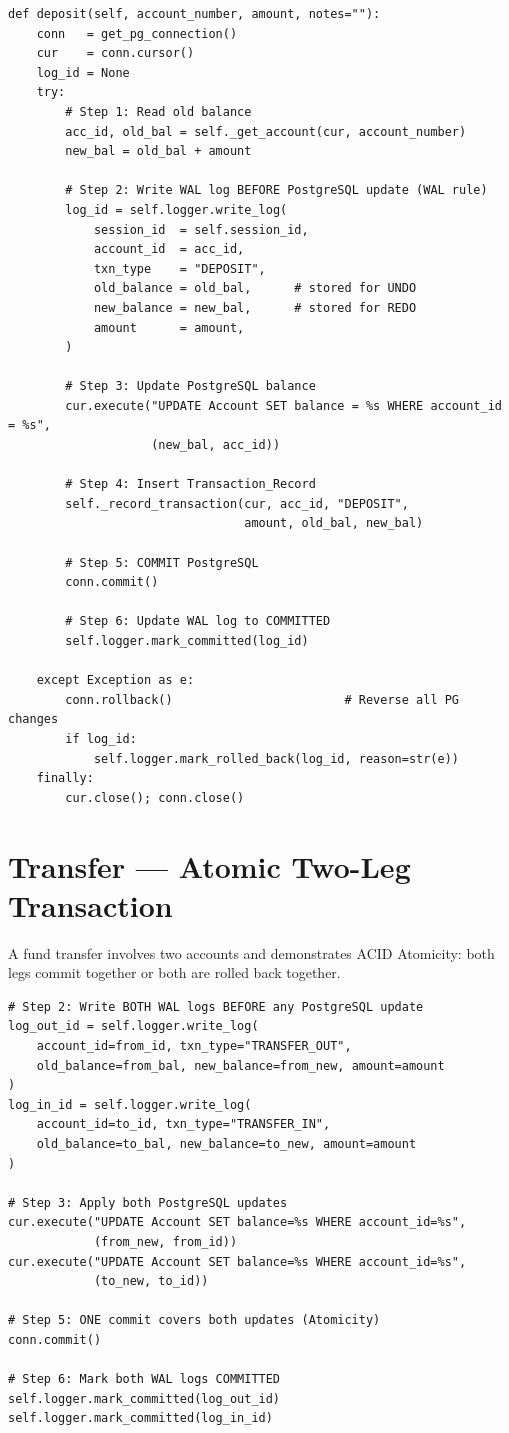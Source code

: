 \begin{lstlisting}[style=pythonstyle, caption={Deposit method --- WAL sequence in Python}]
def deposit(self, account_number, amount, notes=""):
    conn   = get_pg_connection()
    cur    = conn.cursor()
    log_id = None
    try:
        # Step 1: Read old balance
        acc_id, old_bal = self._get_account(cur, account_number)
        new_bal = old_bal + amount

        # Step 2: Write WAL log BEFORE PostgreSQL update (WAL rule)
        log_id = self.logger.write_log(
            session_id  = self.session_id,
            account_id  = acc_id,
            txn_type    = "DEPOSIT",
            old_balance = old_bal,      # stored for UNDO
            new_balance = new_bal,      # stored for REDO
            amount      = amount,
        )

        # Step 3: Update PostgreSQL balance
        cur.execute("UPDATE Account SET balance = %s WHERE account_id = %s",
                    (new_bal, acc_id))

        # Step 4: Insert Transaction_Record
        self._record_transaction(cur, acc_id, "DEPOSIT",
                                 amount, old_bal, new_bal)

        # Step 5: COMMIT PostgreSQL
        conn.commit()

        # Step 6: Update WAL log to COMMITTED
        self.logger.mark_committed(log_id)

    except Exception as e:
        conn.rollback()                        # Reverse all PG changes
        if log_id:
            self.logger.mark_rolled_back(log_id, reason=str(e))
    finally:
        cur.close(); conn.close()
\end{lstlisting}

\section{Transfer --- Atomic Two-Leg Transaction}

A fund transfer involves two accounts and demonstrates ACID Atomicity:
both legs commit together or both are rolled back together.

\begin{lstlisting}[style=pythonstyle, caption={Transfer --- two WAL logs, one PG commit}]
# Step 2: Write BOTH WAL logs BEFORE any PostgreSQL update
log_out_id = self.logger.write_log(
    account_id=from_id, txn_type="TRANSFER_OUT",
    old_balance=from_bal, new_balance=from_new, amount=amount
)
log_in_id = self.logger.write_log(
    account_id=to_id, txn_type="TRANSFER_IN",
    old_balance=to_bal, new_balance=to_new, amount=amount
)

# Step 3: Apply both PostgreSQL updates
cur.execute("UPDATE Account SET balance=%s WHERE account_id=%s",
            (from_new, from_id))
cur.execute("UPDATE Account SET balance=%s WHERE account_id=%s",
            (to_new, to_id))

# Step 5: ONE commit covers both updates (Atomicity)
conn.commit()

# Step 6: Mark both WAL logs COMMITTED
self.logger.mark_committed(log_out_id)
self.logger.mark_committed(log_in_id)
\end{lstlisting}

